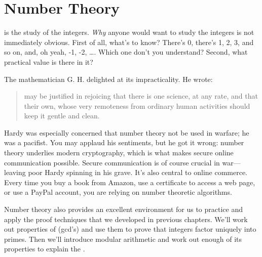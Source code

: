 \chapter{Number Theory}\label{number_theory_chap}

 is the study of the integers.  \emph{Why} anyone
would want to study the integers is not immediately obvious.  First of
all, what's to know?  There's 0, there's 1, 2, 3, and so on, and, oh
yeah, -1, -2, \dots.  Which one don't you understand?  Second, what
practical value is there in it?

\iffalse Number theory is at the core of mathematics; even Ug the
Caveman surely had some grasp of the integers---at least the positive
ones.  In fact, the integers are so elementary that one might ask,
``What's to study?''  There's 0, there's 1, 2, 3 and so on, and
there's the negatives.  Which one don't you understand?  Doesn't math
become easy when we don't have to worry about nasty numbers like
$\sqrt{7}$, $1 / \pi$, and $i$?  We can even forget about fractions!
\fi

The mathematician G. H.  delighted at its impracticality.  He wrote:

 \begin{quotation}
  may be justified in rejoicing that there
 is one science, at any rate, and that their own, whose very
 remoteness from ordinary human activities should keep it gentle and
 clean.
 \end{quotation}

Hardy was especially concerned that number theory not be used in
warfare; he was a pacifist.  You may applaud his sentiments, but he
got it wrong: number theory underlies modern cryptography, which is
what makes secure online communication possible.  Secure communication
is of course crucial in war---leaving poor Hardy spinning in
his grave.  It's also central to online commerce.  Every time you buy
a book from Amazon, use a certificate to access a web page, or use a
PayPal account, you are relying on number theoretic algorithms.

Number theory also provides an excellent environment for us to
practice and apply the proof techniques that we developed in previous
chapters.  We'll work out properties of 
(gcd's) and use them to prove that integers factor uniquely into
primes.  Then we'll introduce modular arithmetic and work out enough
of its properties to explain the .

